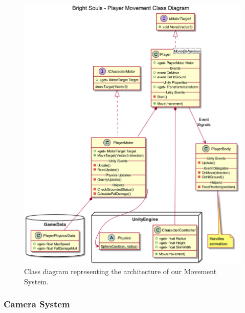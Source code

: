 \begin{figure}[!h]
    \caption{Class diagram representing the architecture of our Movement System.}
    \vspace{0.5em}
    \begin{center}
        \includegraphics[width=34em]{figures/fig-player-movement-class-diagram.png}
    \end{center}
    \label{fig:movement-class-diagram}
\end{figure}

\subsubsection{Camera System}
\label{sec:lock-on-camera}

